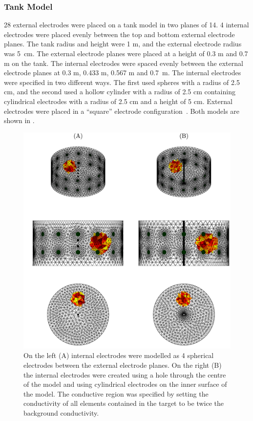 \subsubsection{Tank Model}
28 external electrodes were placed on a tank model in two planes of 14. 
4 internal electrodes were placed evenly between the top and bottom external electrode planes. 
The tank radius and height were 1 m, and the external electrode radius was 5 cm. 
The external electrode planes were placed at a height of 0.3 m and 0.7 m on the tank. 
The internal electrodes were spaced evenly between the external electrode planes 
at 0.3 m, 0.433 m, 0.567 m and 0.7 m. The internal electrodes were specified in 
two different ways. The first used spheres with a radius of 2.5 cm, and the second 
used a hollow cylinder with a radius of 2.5 cm containing cylindrical electrodes
with a radius of 2.5 cm and a height of 5 cm. External electrodes were
placed in a ``square'' electrode configuration~\parencite{grychtol_3d_2016}. 
Both models are shown in .

\begin{figure}[H]
    \centering
   \includegraphics[width=\textwidth]{chapter7-internal_elec_motion/imgs/probe_types.pdf} 
   \caption[Spherical and cylindrical internal electrodes]{\label{fig:probe_types} 
   On the left (A) internal electrodes were modelled as 4 spherical electrodes between the 
   external electrode planes. On the right (B) the internal electrodes were created using 
   a hole through the centre of the model and using cylindrical electrodes on the inner 
   surface of the model.
	The conductive region was specified by setting the conductivity of all elements 
	contained in the target to be twice the background conductivity.}
\end{figure}

